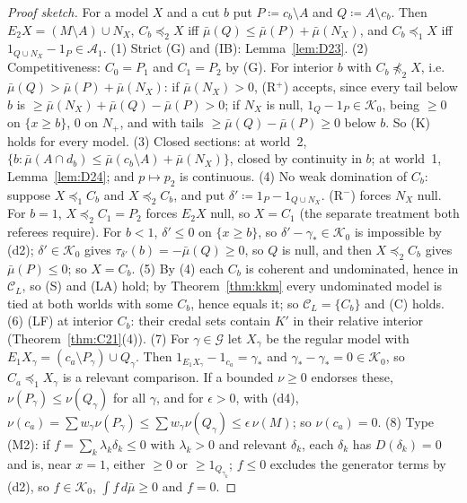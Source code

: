 \documentclass[11pt]{article}
\theoremstyle{definition}
\theoremstyle{remark}
\newcommand{\C}{\mathcal C}
\begin{document}
\begin{proof}[Proof sketch]
For a model $X$ and a cut $b$ put $P\coloneqq c_b\setminus A$ and $Q\coloneqq A\setminus c_b$. Then $E_2X=(M\setminus A)\cup N_X$, $C_b\preceq_2X$ iff $\bar\mu(Q)\le\bar\mu(P)+\bar\mu(N_X)$, and $C_b\preceq_1X$ iff $1_{Q\cup N_X}-1_P\in\mathcal A_1$. (1) Strict (G) and (IB): Lemma~\ref{lem:D23}. (2) Competitiveness: $C_0=P_1$ and $C_1=P_2$ by (G). For interior $b$ with $C_b\not\preceq_2X$, i.e.\ $\bar\mu(Q)>\bar\mu(P)+\bar\mu(N_X)$: if $\bar\mu(N_X)>0$, (R$^+$) accepts, since every tail below $b$ is $\ge\bar\mu(N_X)+\bar\mu(Q)-\bar\mu(P)>0$; if $N_X$ is null, $1_Q-1_P\in\mathcal K_0$, being $\ge0$ on $\{x\ge b\}$, $0$ on $N_+$, and with tails $\ge\bar\mu(Q)-\bar\mu(P)\ge0$ below $b$. So (K) holds for every model. (3) Closed sections: at world~2, $\{b:\bar\mu(A\cap d_b)\le\bar\mu(c_b\setminus A)+\bar\mu(N_X)\}$, closed by continuity in $b$; at world~1, Lemma~\ref{lem:D24}; and $p\mapsto p_2$ is continuous. (4) No weak domination of $C_b$: suppose $X\preceq_1C_b$ and $X\preceq_2C_b$, and put $\delta'\coloneqq1_P-1_{Q\cup N_X}$. (R$^-$) forces $N_X$ null. For $b=1$, $X\preceq_2C_1=P_2$ forces $E_2X$ null, so $X=C_1$ (the separate treatment both referees require). For $b<1$, $\delta'\le0$ on $\{x\ge b\}$, so $\delta'-\gamma_*\in\mathcal K_0$ is impossible by (d2); $\delta'\in\mathcal K_0$ gives $\tau_{\delta'}(b)=-\bar\mu(Q)\ge0$, so $Q$ is null, and then $X\preceq_2C_b$ gives $\bar\mu(P)\le0$; so $X=C_b$. (5) By (4) each $C_b$ is coherent and undominated, hence in $\C_L$, so (S) and (LA) hold; by Theorem~\ref{thm:kkm} every undominated model is tied at both worlds with some $C_b$, hence equals it; so $\C_L=\{C_b\}$ and (C) holds. (6) (LF) at interior $C_b$: their credal sets contain $K'$ in their relative interior (Theorem~\ref{thm:C21}(4)). (7) For $\gamma\in\mathcal G$ let $X_\gamma$ be the regular model with $E_1X_\gamma=(c_a\setminus P_\gamma)\cup Q_\gamma$. Then $1_{E_1X_\gamma}-1_{c_a}=\gamma_*$ and $\gamma_*-\gamma_*=0\in\mathcal K_0$, so $C_a\preceq_1X_\gamma$ is a relevant comparison. If a bounded $\nu\ge0$ endorses these, $\nu(P_\gamma)\le\nu(Q_\gamma)$ for all $\gamma$, and for $\epsilon>0$, with (d4), $\nu(c_a)=\sum w_\gamma\nu(P_\gamma)\le\sum w_\gamma\nu(Q_\gamma)\le\epsilon\,\nu(M)$; so $\nu(c_a)=0$. (8) Type (M2): if $f=\sum_k\lambda_k\delta_k\le0$ with $\lambda_k>0$ and relevant $\delta_k$, each $\delta_k$ has $D(\delta_k)=0$ and is, near $x=1$, either $\ge0$ or $\ge1_{Q_{\gamma_k}}$; $f\le0$ excludes the generator terms by (d2), so $f\in\mathcal K_0$, $\int f\,d\bar\mu\ge0$ and $f=0$.
\end{proof}
\end{document}
